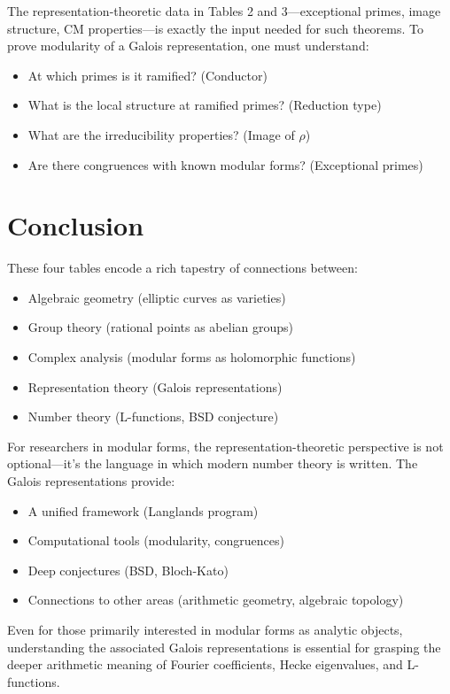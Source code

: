 \documentclass[11pt]{article}
\begin{document}
The representation-theoretic data in Tables 2 and 3---exceptional primes, image structure, CM properties---is exactly the input needed for such theorems. To prove modularity of a Galois representation, one must understand:
\begin{itemize}
\item At which primes is it ramified? (Conductor)
\item What is the local structure at ramified primes? (Reduction type)
\item What are the irreducibility properties? (Image of $\rho$)
\item Are there congruences with known modular forms? (Exceptional primes)
\end{itemize}

\section{Conclusion}

These four tables encode a rich tapestry of connections between:
\begin{itemize}
\item Algebraic geometry (elliptic curves as varieties)
\item Group theory (rational points as abelian groups)
\item Complex analysis (modular forms as holomorphic functions)
\item Representation theory (Galois representations)
\item Number theory (L-functions, BSD conjecture)
\end{itemize}

For researchers in modular forms, the representation-theoretic perspective is not optional---it's the language in which modern number theory is written. The Galois representations provide:
\begin{itemize}
\item A unified framework (Langlands program)
\item Computational tools (modularity, congruences)
\item Deep conjectures (BSD, Bloch-Kato)
\item Connections to other areas (arithmetic geometry, algebraic topology)
\end{itemize}

Even for those primarily interested in modular forms as analytic objects, understanding the associated Galois representations is essential for grasping the deeper arithmetic meaning of Fourier coefficients, Hecke eigenvalues, and L-functions.
\end{document}
